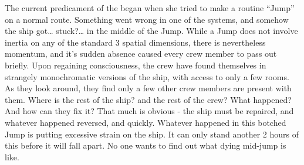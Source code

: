 \documentclass[blue]{TMFHope}
\begin{document}
The current predicament of the \pNew{} began when she tried to make a routine ``Jump'' on a normal route. Something went wrong in one of the systems, and somehow the ship got\ldots{} stuck?\ldots{} in the middle of the Jump. While a Jump does not involve inertia on any of the standard 3 spatial dimensions, there is nevertheless momentum, and it's sudden absence caused every crew member to pass out briefly. Upon regaining consciousness, the crew have found themselves in strangely monochromatic versions of the ship, with access to only a few rooms. As they look around, they find only a few other crew members are present with them. Where is the rest of the ship? and the rest of the crew? What happened? And how can they fix it? That much is obvious - the ship must be repaired, and whatever happened reversed, and quickly. Whatever happened in this botched Jump is putting excessive strain on the ship. It can only stand another 2 hours of this before it will fall apart. No one wants to find out what dying mid-jump is like.
\end{document}
